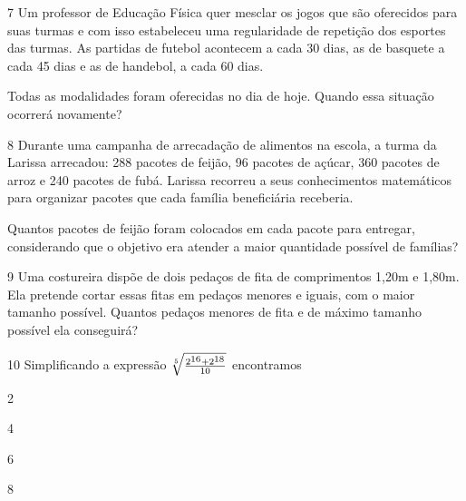 \num{7} Um professor de Educação Física quer mesclar os jogos que são
oferecidos para suas turmas e com isso estabeleceu uma regularidade de
repetição dos esportes das turmas. As partidas de futebol acontecem a 
cada 30 dias, as de basquete a cada 45 dias e as de handebol, a cada 60 dias.

Todas as modalidades foram oferecidas no dia de hoje. Quando essa
situação ocorrerá novamente?

\begin{emptybox}
\end{emptybox}

\num{8} Durante uma campanha de arrecadação de alimentos na escola,
a turma da Larissa arrecadou: 288 pacotes de feijão, 96 pacotes de açúcar,
360 pacotes de arroz e 240 pacotes de fubá. Larissa recorreu a seus
conhecimentos matemáticos para organizar pacotes que cada família
beneficiária receberia.

Quantos pacotes de feijão foram colocados em cada pacote para entregar,
considerando que o objetivo era atender a maior quantidade possível de
famílias?

\begin{emptybox}
\end{emptybox}

\pagebreak
\num{9} Uma costureira dispõe de dois pedaços de fita de comprimentos
1,20m e 1,80m. Ela pretende cortar essas fitas em pedaços menores e 
iguais, com o maior tamanho possível. Quantos pedaços menores de fita 
e de máximo tamanho possível ela conseguirá?

\begin{emptybox}
\end{emptybox}

\num{10} Simplificando a expressão $\sqrt[5]{\frac{2\textsuperscript{16}+2\textsuperscript{18}}{10}}$ encontramos

\begin{minipage}{.5\textwidth}
\begin{escolha}
\item 2
\item 4
\item 6
\item 8
\end{escolha}
\end{minipage}

